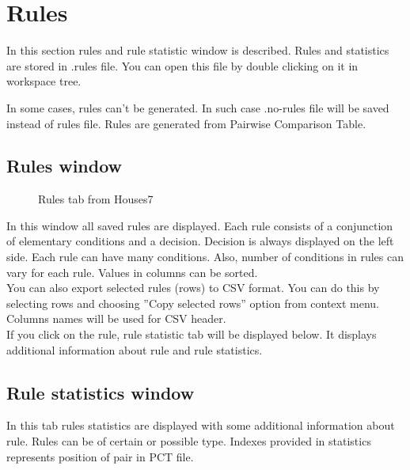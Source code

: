 \section{Rules}\label{section:rules}

In this section rules and rule statistic window is described. Rules and statistics are stored in .rules file. You can open this file by double clicking on it in workspace tree.

In some cases, rules can't be generated. In such case .no-rules file will be saved instead of rules file. Rules are generated from Pairwise Comparison Table.

\subsection{Rules window}\label{sub:rules}

\begin{figure*}[!ht] 
	\centering
	\caption{Rules tab from Houses7}
\end{figure*}

In this window all saved rules are displayed. Each rule consists of a conjunction of elementary conditions and a decision. Decision is always displayed on the left side. Each rule can have many conditions. Also, number of conditions in rules can vary for each rule. Values in columns can be sorted.\\

You can also export selected rules (rows) to CSV format. You can do this by selecting rows and choosing ''Copy selected rows'' option from context menu. Columns names will be used for CSV header.\\

If you click on the rule, rule statistic tab will be displayed below. It displays additional information about rule and rule statistics.

\subsection{Rule statistics window}\label{sub:rule-stat}

In this tab rules statistics are displayed with some additional information about rule.
Rules can be of certain or possible type. Indexes provided in statistics represents position of pair in PCT file.\\\\

